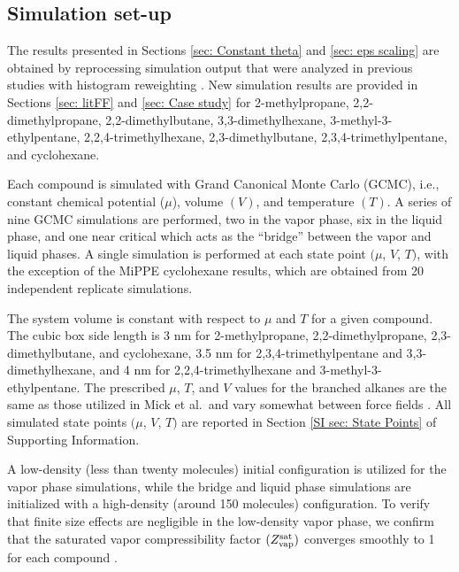 \documentclass[journal=jced,manuscript=article]{achemso}
\begin{document}
\subsection{Simulation set-up} \label{sec: Simulation set-up}

The results presented in Sections \ref{sec: Constant theta} and \ref{sec: eps scaling} are obtained by reprocessing simulation output that were analyzed in previous studies with histogram reweighting \cite{Potoff_branched,Barhaghi2017}. New simulation results are provided in Sections \ref{sec: litFF} and \ref{sec: Case study} for 2-methylpropane, 2,2-dimethylpropane, 2,2-dimethylbutane, 3,3-dimethylhexane, 3-methyl-3-ethylpentane, 2,2,4-trimethylhexane, 2,3-dimethylbutane, 2,3,4-trimethylpentane, and cyclohexane. 

Each compound is simulated with Grand Canonical Monte Carlo (GCMC), i.e., constant chemical potential ($\mu$), volume $(V)$, and temperature $(T)$. A series of nine GCMC simulations are performed, two in the vapor phase, six in the liquid phase, and one near critical which acts as the ``bridge'' between the vapor and liquid phases. A single simulation is performed at each state point $(\mu$, $V$, $T)$, with the exception of the MiPPE cyclohexane results, which are obtained from 20 independent replicate simulations. 

The system volume is constant with respect to $\mu$ and $T$ for a given compound. The cubic box side length is 3 nm for 2-methylpropane, 2,2-dimethylpropane, 2,3-dimethylbutane, and cyclohexane, 3.5 nm for 2,3,4-trimethylpentane and 3,3-dimethylhexane, and 4 nm for 2,2,4-trimethylhexane and 3-methyl-3-ethylpentane. The prescribed $\mu$, $T$, and $V$ values for the branched alkanes are the same as those utilized in Mick et al.~and vary somewhat between force fields \cite{Potoff_branched}. All simulated state points $(\mu$, $V$, $T)$ are reported in Section \ref{SI sec: State Points} of Supporting Information. 

A low-density (less than twenty molecules) initial configuration is utilized for the vapor phase simulations, while the bridge and liquid phase simulations are initialized with a high-density (around 150 molecules) configuration. To verify that finite size effects are negligible in the low-density vapor phase, we confirm that the saturated vapor compressibility factor $(Z^{\rm sat}_{\rm vap})$ converges smoothly to 1 for each compound \cite{Nezbeda2016}.

\end{document}
